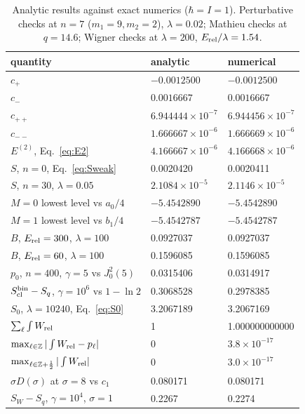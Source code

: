 \documentclass[pra,twocolumn,superscriptaddress,longbibliography,floatfix]{revtex4-2}
\newcommand{\Erel}{E_{\rm rel}}
\newcommand{\Scl}{S_{\rm cl}}
\newcommand{\SW}{S_{W}}
\begin{document}
\begin{table}[h]
\caption{Analytic results against exact numerics ($\hbar=I=1$). Perturbative
checks at $n=7$ ($m_{1}=9,m_{2}=2$), $\lambda=0.02$; Mathieu checks at
$q=14.6$; Wigner checks at $\lambda=200$, $\Erel/\lambda=1.54$.}
\label{tab:checks}
\footnotesize
\setlength{\tabcolsep}{2pt}
\begin{ruledtabular}
\begin{tabular}{lll}
quantity & analytic & numerical\\
\hline
$c_{+}$ & $-0.0012500$ & $-0.0012500$\\
$c_{-}$ & $0.0016667$ & $0.0016667$\\
$c_{++}$ & $6.944444\times10^{-7}$ & $6.944456\times10^{-7}$\\
$c_{--}$ & $1.666667\times10^{-6}$ & $1.666669\times10^{-6}$\\
$E^{(2)}$, Eq.~\eqref{eq:E2} & $4.166667\times10^{-6}$ & $4.166668\times10^{-6}$\\
$S$, $n=0$, Eq.~\eqref{eq:Sweak} & 0.0020420 & 0.0020411\\
$S$, $n=30$, $\lambda=0.05$ & $2.1084\times10^{-5}$ & $2.1146\times10^{-5}$\\
$M=0$ lowest level vs $a_{0}/4$ & $-5.4542890$ & $-5.4542890$\\
$M=1$ lowest level vs $b_{1}/4$ & $-5.4542787$ & $-5.4542787$\\
$B$, $\Erel=300$, $\lambda=100$ & 0.0927037 & 0.0927037\\
$B$, $\Erel=60$, $\lambda=100$ & 0.1596085 & 0.1596085\\
$p_{0}$, $n=400$, $\gamma=5$ vs $J_{0}^{2}(5)$ & 0.0315406 & 0.0314917\\
$\Scl^{\rm bin}-S_{q}$, $\gamma=10^{6}$ vs $1-\ln2$ & 0.3068528 & 0.2978385\\
$S_{0}$, $\lambda=10240$, Eq.~\eqref{eq:S0} & 3.2067189 & 3.2067169\\
$\sum_{\ell}\int W_{\rm rel}$ & 1 & 1.000000000000\\
$\max_{\ell\in\mathbb{Z}}|\int W_{\rm rel}-p_{\ell}|$ & 0 & $3.8\times10^{-17}$\\
$\max_{\ell\in\mathbb{Z}+\frac12}|\int W_{\rm rel}|$ & 0 & $3.0\times10^{-17}$\\
$\sigma D(\sigma)$ at $\sigma=8$ vs $c_{1}$ & 0.080171 & 0.080171\\
$\SW-S_{q}$, $\gamma=10^{4}$, $\sigma=1$ & 0.2267 & 0.2274\\
\end{tabular}
\end{ruledtabular}
\end{table}
\end{document}
